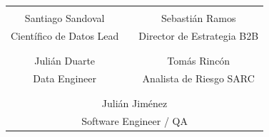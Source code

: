 \documentclass[11pt,a4paper]{article}
\begin{document}
\vspace{1cm}
\begin{table}[h!]
\centering
\begin{tabular}{ccc}
\underline{\hspace{4.5cm}} & \hspace{0.5cm} & \underline{\hspace{4.5cm}} \\
Santiago Sandoval & & Sebastián Ramos \\
Científico de Datos Lead & & Director de Estrategia B2B \\
\vspace{1cm} & & \\
\underline{\hspace{4.5cm}} & \hspace{0.5cm} & \underline{\hspace{4.5cm}} \\
Julián Duarte & & Tomás Rincón \\
Data Engineer & & Analista de Riesgo SARC \\
\vspace{1cm} & & \\
\multicolumn{3}{c}{\underline{\hspace{4.5cm}}} \\
\multicolumn{3}{c}{Julián Jiménez} \\
\multicolumn{3}{c}{Software Engineer / QA}
\end{tabular}
\end{table}
\end{document}
